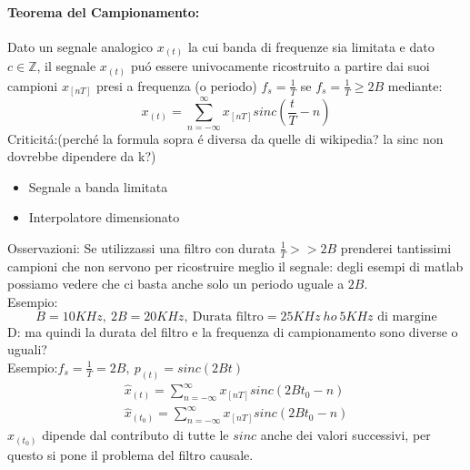         \paragraph{Teorema del Campionamento:} Dato un segnale analogico $x_{(t)}$ la cui banda di frequenze sia limitata e dato $c\in \mathbb{Z}$,
        il segnale $x_{(t)}$ puó essere univocamente ricostruito a partire dai suoi campioni $x_{[nT]}$ presi a frequenza (o periodo) $f_s = \frac{1}{T}$ se 
        $f_s = \frac{1}{T} \geq 2B$ mediante:
        \[
            x_{(t)} = \sum_{n=-\infty}^{\infty} x_{[nT]}sinc\left(\frac{t}{T}-n\right) 
        \]
        Criticitá:(perché la formula sopra é diversa da quelle di wikipedia? la sinc non dovrebbe dipendere da k?)
        \begin{itemize}
            \item {Segnale a banda limitata}
            \item {Interpolatore dimensionato}
        \end{itemize}
        Osservazioni: Se utilizzassi una filtro con durata $\frac{1}{T}>>2B$ prenderei tantissimi campioni che
        non servono per ricostruire meglio il segnale: degli esempi di matlab possiamo vedere che ci basta anche solo un periodo uguale a $2B$.\\
        Esempio:
        \[
            B = 10KHz,\ 2B = 20KHz,\ \text{Durata filtro} = 25KHz\ ho\ 5KHz\text{ di margine}
        \]
        {\color{red}D:} ma quindi la durata del filtro e la frequenza di campionamento sono diverse o uguali?\\
        Esempio:$f_s = \frac{1}{T} = 2B,\ p_{(t)}=sinc(2Bt)$
        \begin{gather}
                \hat{x}_{(t)} = \sum_{n=-\infty}^{\infty} x_{[nT]}sinc\left(2Bt_0 -n\right) \nonumber \\
                \hat{x}_{(t_0)} = \sum_{n=-\infty}^{\infty} x_{[nT]}sinc\left(2Bt_0 -n\right) \nonumber
        \end{gather}
        $\hat{x}_{(t_0)}$ dipende dal contributo di tutte le $sinc$ anche dei valori successivi, per questo si pone il problema del filtro causale. 
